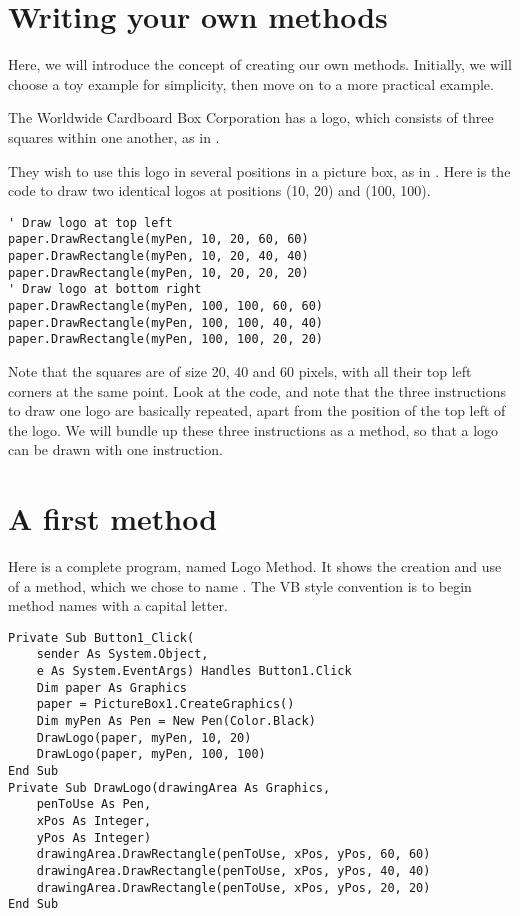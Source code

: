 	\section{Writing your own methods}
		Here, we will introduce the concept of creating our own methods. Initially, we will choose a toy example for simplicity, then move on to a more practical example.
		
		The Worldwide Cardboard Box Corporation has a logo, which consists of three squares within one another, as in .
		
		They wish to use this logo in several positions in a picture box, as in . Here is the code to draw two identical logos at positions (10, 20) and (100, 100).
		\begin{lstlisting}
' Draw logo at top left
paper.DrawRectangle(myPen, 10, 20, 60, 60)
paper.DrawRectangle(myPen, 10, 20, 40, 40)
paper.DrawRectangle(myPen, 10, 20, 20, 20)
' Draw logo at bottom right
paper.DrawRectangle(myPen, 100, 100, 60, 60)
paper.DrawRectangle(myPen, 100, 100, 40, 40)
paper.DrawRectangle(myPen, 100, 100, 20, 20)
		\end{lstlisting}
		Note that the squares are of size 20, 40 and 60 pixels, with all their top left corners at the same point. Look at the code, and note that the three instructions to draw one logo are basically repeated, apart from the position of the top left of the logo. We will bundle up these three instructions as a method, so that a logo can be drawn with one instruction.

	\section{A first method}
		Here is a complete program, named Logo Method. It shows the creation and use of a method, which we chose to name . The VB style convention is to begin method names with a capital letter.
		\begin{lstlisting}
Private Sub Button1_Click(
	sender As System.Object,
	e As System.EventArgs) Handles Button1.Click
	Dim paper As Graphics
	paper = PictureBox1.CreateGraphics()
	Dim myPen As Pen = New Pen(Color.Black)
	DrawLogo(paper, myPen, 10, 20)
	DrawLogo(paper, myPen, 100, 100)
End Sub
Private Sub DrawLogo(drawingArea As Graphics,
	penToUse As Pen,
	xPos As Integer,
	yPos As Integer)
	drawingArea.DrawRectangle(penToUse, xPos, yPos, 60, 60)
	drawingArea.DrawRectangle(penToUse, xPos, yPos, 40, 40)
	drawingArea.DrawRectangle(penToUse, xPos, yPos, 20, 20)
End Sub
		\end{lstlisting}

